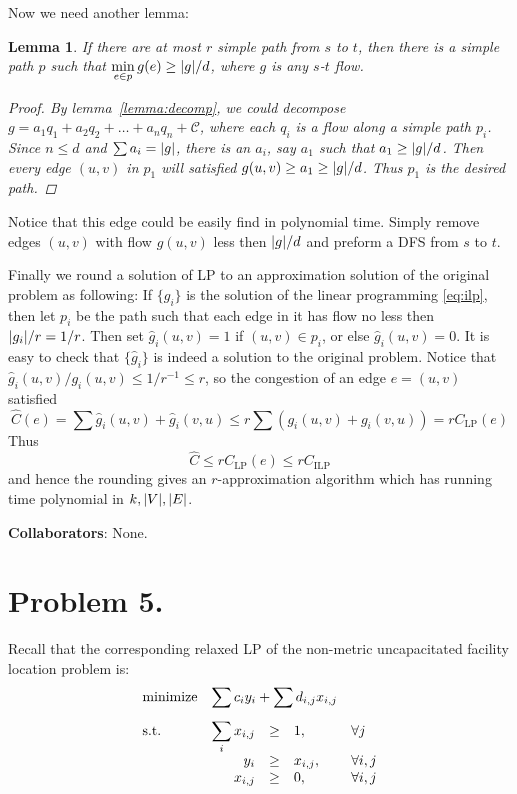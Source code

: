 \documentclass[12pt, a4paper]{article}
\DeclarePairedDelimiter{\abs}{\lvert}{\rvert}
\newtheorem{lemma}{Lemma}
\begin{document}
Now we need another lemma:
\begin{lemma}
  If there are at most $r$ simple path from $s$ to $t$, then there is a simple path $p$
  such that $\min\limits_{e \in p} g(e) \geq \abs{g} / d$, where $g$ is any $s$-$t$ flow.

  \begin{proof}
    By lemma~\ref{lemma:decomp}, we could decompose $g = a_1 q_1 + a_2 q_2 + \dots + a_n q_n + \mathcal{C}$,
    where each $q_i$ is a flow along a simple path $p_i$. Since $n \leq d$ and $\sum a_i = \abs{g}$,
    there is an $a_i$, say $a_1$ such that $a_1 \geq \abs{g} / d$.
    Then every edge $(u, v)$ in $p_1$ will satisfied $g(u, v) \geq a_1 \geq \abs{g} / d$. Thus $p_1$
    is the desired path.
  \end{proof}
\end{lemma}
Notice that this edge could be easily find in polynomial time. Simply remove edges $(u, v)$ with
flow $g(u, v)$ less then $\abs{g}/d$ and preform a DFS from $s$ to $t$.

Finally we round a solution of LP to an approximation solution of the original problem as following:
If $\{g_i\}$ is the solution of the linear programming \eqref{eq:ilp}, then let $p_i$ be the path
such that each edge in it has flow no less then $\abs{g_i} / r = 1 / r$. Then set $\hat{g}_i(u, v) = 1$
if $(u, v) \in p_i$, or else $\hat{g}_i(u, v) = 0$. It is easy to check that $\{\hat{g}_i\}$ is
indeed a solution to the original problem. Notice that $\hat{g}_i(u, v) / g_i(u, v) \leq 1 / r^{-1} \leq r$,
so the congestion of an edge $e = (u, v)$ satisfied
\[ \hat{C}(e) = \sum \hat{g}_i(u, v) + \hat{g}_i(v, u) \leq r \sum \left( g_i(u, v) + g_i(v, u) \right) = rC_{\text{LP}}(e) \]
Thus
\[ \hat{C} \leq r C_{\text{LP}}(e) \leq r C_{\text{ILP}} \]
and hence the rounding gives an $r$-approximation algorithm which has running time polynomial in $k, \abs{V}, \abs{E}$.

{\bf Collaborators}: None.

\section{Problem 5.}

Recall that the corresponding relaxed LP of the non-metric uncapacitated facility location problem is:
\begin{equation} \label{eq:lp}
  \begin{array}{>{\displaystyle}l>{\displaystyle}r>{\displaystyle}c*2{>{\displaystyle}l}}
    \text{minimize} & \multicolumn{3}{l}{\displaystyle \sum c_i y_i + \sum d_{i,j} x_{i,j}} \\[10pt]
    \text{s.t.} & \sum_i x_{i, j} & \geq & 1, & \forall j \\
    & y_i & \geq & x_{i, j}, & \forall i, j \\
    & x_{i, j} & \geq & 0, & \forall i, j
  \end{array}
\end{equation}
\end{document}
